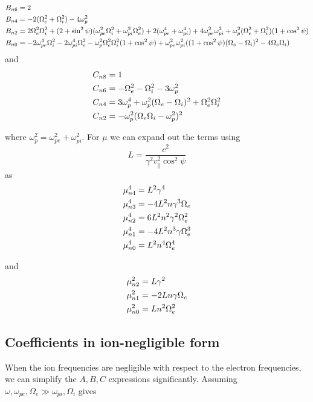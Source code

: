 \documentclass[]{article}
\begin{document}
\begin{align}
B_{n6} &= 2\notag\\
B_{n4} &= -2 (\Omega_e^2 +\Omega_i^2) - 4 \omega_p^2\notag\\
B_{n2} &= 2\Omega_e^2\Omega_i^2 + (2+\sin^2 \psi)(\omega_{pe}^2 \Omega_i^2 + \omega_{pi}^2\Omega_e^2) + 2(\omega_{pe}^4 + \omega_{pi}^4) + 4 \omega_{pe}^2\omega_{pi}^2 +\omega_p^2(\Omega_e^2 + \Omega_i^2)(1+\cos^2\psi)\notag\\
B_{n0} &= -2\omega_{pe}^4\Omega_i^2 - 2\omega_{pi}^4 \Omega_e^2 - \omega_p^2\Omega_e^2\Omega_i^2(1+\cos^2 \psi) + \omega_{pe}^2\omega_{pi}^2( (1+\cos^2\psi)(\Omega_e-\Omega_i)^2 - 4 \Omega_e\Omega_i)
\end{align}
and
\begin{align}
C_{n8} &= 1\notag\\
C_{n6} &= -\Omega_e^2 -\Omega_i^2 - 3\omega_p^2\notag\\
C_{n4} &= 3\omega_p^4 + \omega_p^2(\Omega_e - \Omega_i)^2 + \Omega_e^2\Omega_i^2\notag\\
C_{n2} &= -\omega_p^2 (\Omega_e\Omega_i - \omega_p^2)^2
\end{align}

where $\omega_p^2 = \omega_{pe}^2 + \omega_{pi}^2$. For $\mu$ we can expand out the terms using
\[ L = \frac{c^2}{\gamma^2 v_\parallel^2 \cos^2\psi}\]
as
\begin{align}
\mu_{n4}^4 &= L^2 \gamma^4 \notag\\
\mu_{n3}^4 &= -4 L^2 n \gamma^3 \Omega_e \notag\\
\mu_{n2}^4 &= 6L^2 n^2 \gamma^2 \Omega_e^2 \notag\\
\mu_{n1}^4 &= - 4 L^2 n^3 \gamma \Omega_e^3 \notag\\
\mu_{n0}^4 &= L^2 n^4 \Omega_e^4
\end{align}

and
\begin{align}
\mu_{n2}^2 &= L \gamma^2 \notag\\
\mu_{n1}^2 &= -2 L n \gamma \Omega_e \notag\\
\mu_{n0}^2 &= L n^2 \Omega_e^2
\end{align}

\subsection{Coefficients in ion-negligible form}

When the ion frequencies are negligible with respect to the electron frequencies, we can simplify the $A, B, C$ expressions significantly. Assuming $\omega, \omega_{pe}, \Omega_e \gg \omega_{pi}, \Omega_i$ gives 
\end{document}
